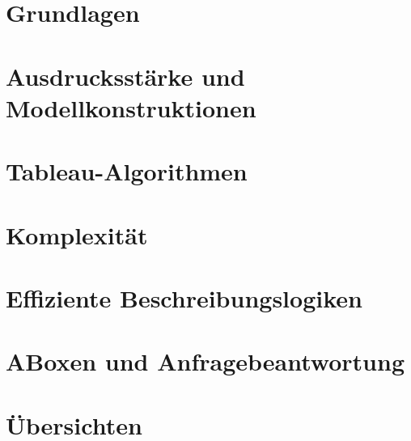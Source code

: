 \documentclass{settings/template}
\begin{document}
	
	

	\settitlepage{} %

	\setpagestyle
	\pagestyle{fancy}
	\renewcommand{\headrulewidth}{0.1pt}
	\fancyhead[R]{ }
	\fancyhead[L]{\leftmark}
	\fancyfoot[C]{\thepage}
	\settableofcontents


	\normalsize

	\setcounter{section}{1}
	\section{Grundlagen}
	
	\newpage

	\section{Ausdrucksstärke und Modellkonstruktionen}
	\newpage

	\section{Tableau-Algorithmen}
	\newpage

	\section{Komplexität}
	\newpage

	\section{Effiziente Beschreibungslogiken}
	\newpage

	\section{ABoxen und Anfragebeantwortung}
	\newpage

	\section{Übersichten}
	\newpage


	\setbibliography
\end{document}
